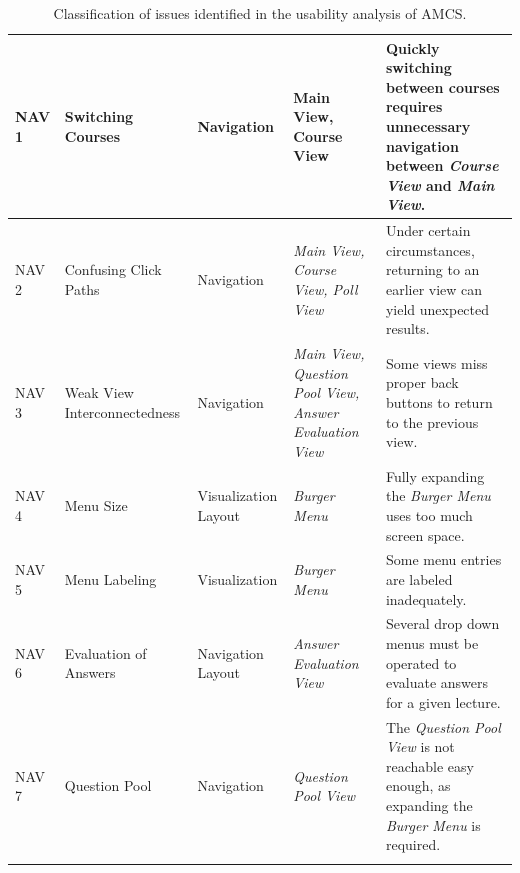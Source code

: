 \begin{longtable}{ | p{1.1cm} | p{2cm} | p{2cm} | p{2.5cm} | p{5.5cm} |}
	NAV 1 & Switching Courses & Navigation & Main View, \newline Course View & Quickly switching between courses requires unnecessary navigation between \emph{Course View} and \emph{Main View}. \\ \hline    
	NAV 2 & Confusing Click Paths & Navigation & \emph{Main View, \newline Course View, \newline Poll View} & Under certain circumstances, returning to an earlier view can yield unexpected results. \\ \hline
	NAV 3 & Weak View Interconnectedness & Navigation & \emph{Main View, \newline Question Pool View, \newline Answer Evaluation View} & Some views miss proper back buttons to return to the previous view. \\ \hline
	NAV 4 & Menu Size & Visualization \newline Layout & \emph{Burger Menu} & Fully expanding the \emph{Burger Menu} uses too much screen space. \\ \hline
	NAV 5 & Menu Labeling & Visualization & \emph{Burger Menu} & Some menu entries are labeled inadequately. \\ \hline            
	NAV 6 & Evaluation of Answers & Navigation \newline Layout & \emph{Answer Evaluation View} & Several drop down menus must be operated to evaluate answers for a given lecture. \\ \hline    
	NAV 7 & Question Pool & Navigation & \emph{Question Pool View} & The \emph{Question Pool View} is not reachable easy enough, as expanding the \emph{Burger Menu} is required. \\ \hline                                    
	
	\caption{Classification of issues identified in the usability analysis of AMCS.}
	\label{tab:problems2}
\end{longtable}

